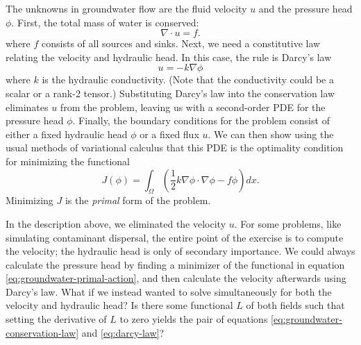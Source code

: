 \documentclass{article}
\theoremstyle{definition}
\theoremstyle{plain}
\begin{document}
The unknowns in groundwater flow are the fluid velocity $u$ and the pressure head $\phi$.
First, the total mass of water is conserved:
\begin{equation}
    \nabla\cdot u = f.
    \label{eq:groundwater-conservation-law}
\end{equation}
where $f$ consists of all sources and sinks.
Next, we need a constitutive law relating the velocity and hydraulic head.
In this case, the rule is Darcy's law
\begin{equation}
    u = -k\nabla\phi
    \label{eq:darcy-law}
\end{equation}
where $k$ is the hydraulic conductivity.
(Note that the conductivity could be a scalar or a rank-2 tensor.)
Substituting Darcy's law into the conservation law eliminates $u$ from the problem, leaving us with a second-order PDE for the pressure head $\phi$.
Finally, the boundary conditions for the problem consist of either a fixed hydraulic head $\phi$ or a fixed flux $u$.
We can then show using the usual methods of variational calculus that this PDE is the optimality condition for minimizing the functional
\begin{equation}
    J(\phi) = \int_\Omega\left(\frac{1}{2}k\nabla\phi\cdot\nabla\phi - f\phi\right)dx.
    \label{eq:groundwater-primal-action}
\end{equation}
Minimizing $J$ is the \emph{primal} form of the problem.

In the description above, we eliminated the velocity $u$.
For some problems, like simulating contaminant dispersal, the entire point of the exercise is to compute the velocity; the hydraulic head is only of secondary importance.
We could always calculate the pressure head by finding a minimizer of the functional in equation \eqref{eq:groundwater-primal-action}, and then calculate the velocity afterwards using Darcy's law.
What if we instead wanted to solve simultaneously for both the velocity and hydraulic head?
Is there some functional $L$ of both fields such that setting the derivative of $L$ to zero yields the pair of equations \eqref{eq:groundwater-conservation-law} and \eqref{eq:darcy-law}?
\end{document}
